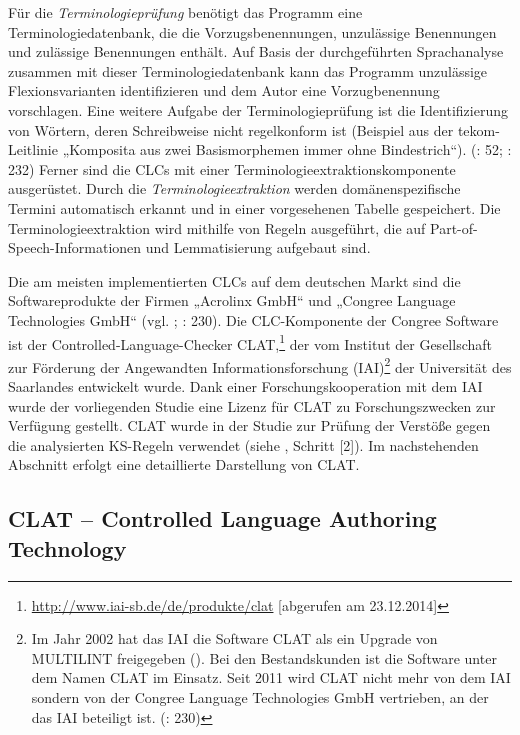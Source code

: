 Für die \textit{Terminologieprüfung} benötigt das Programm eine Terminologiedatenbank, die die Vorzugsbenennungen, unzulässige Benennungen und zulässige Benennungen enthält. Auf Basis der durchgeführten Sprachanalyse zusammen mit dieser Terminologiedatenbank kann das Programm unzulässige Flexionsvarianten identifizieren und dem Autor eine Vorzugbenennung vorschlagen. Eine weitere Aufgabe der Terminologieprüfung ist die Identifizierung von Wörtern, deren Schreibweise nicht regelkonform ist (Beispiel aus der tekom-Leitlinie „Komposita aus zwei Basismorphemen immer ohne Bindestrich“). (\citealt{Siegel2013}: 52; \citealt{DrewerZiegler2014}: 232) Ferner sind die CLCs mit einer Terminologieextraktionskomponente ausgerüstet. Durch die \textit{Terminologieextraktion} werden domänenspezifische Termini automatisch erkannt und in einer vorgesehenen Tabelle gespeichert. Die Terminologieextraktion wird mithilfe von Regeln ausgeführt, die auf Part-of-Speech-Informationen und Lemmatisierung aufgebaut sind. \citep[52]{Siegel2013}

Die am meisten implementierten CLCs auf dem deutschen Markt sind die Softwareprodukte der Firmen „Acrolinx GmbH“ und „Congree Language Technologies GmbH“ (vgl. \citealt{Geldbach2009}; \citealt{DrewerZiegler2014}: 230). Die CLC-Komponente der Congree Software ist der Controlled-Language-Checker CLAT,\footnote{\url{http://www.iai-sb.de/de/produkte/clat} [abgerufen am 23.12.2014]} der vom Institut der Gesellschaft zur Förderung der Angewandten Informationsforschung (IAI)\footnote{Im Jahr 2002 hat das IAI die Software CLAT als ein Upgrade von MULTILINT freigegeben (\citealt{RamirezPoloHaller2005}). Bei den Bestandskunden ist die Software unter dem Namen CLAT im Einsatz. Seit 2011 wird CLAT nicht mehr von dem IAI sondern von der Congree Language Technologies GmbH vertrieben, an der das IAI beteiligt ist. (\citealt{DrewerZiegler2014}: 230)} der Universität des Saarlandes entwickelt wurde. Dank einer Forschungskooperation mit dem IAI wurde der vorliegenden Studie eine Lizenz für CLAT zu Forschungszwecken zur Verfügung gestellt. CLAT wurde in der Studie zur Prüfung der Verstöße gegen die analysierten KS-Regeln verwendet (siehe , Schritt [2]). Im nachstehenden Abschnitt erfolgt eine detaillierte Darstellung von CLAT.

\subsection{CLAT -- Controlled Language Authoring Technology}

